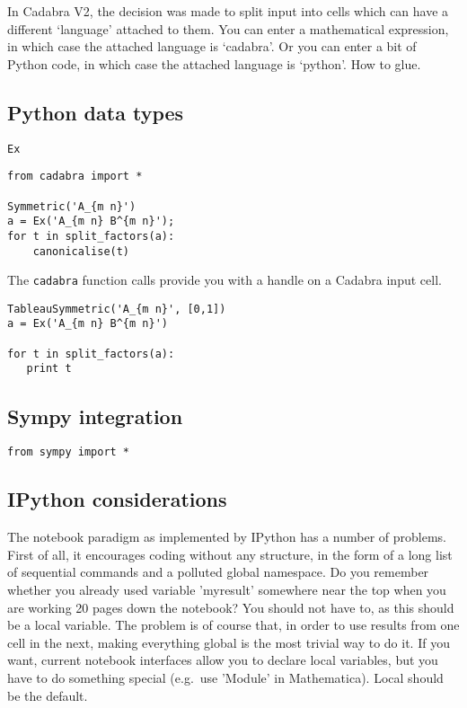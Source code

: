 \documentclass[11pt]{article}
\begin{document}
In Cadabra V2, the decision was made to split input into cells which
can have a different `language' attached to them. You can enter a
mathematical expression, in which case the attached language is
`cadabra'. Or you can enter a bit of Python code, in which case the
attached language is `python'. How to glue.

\subsection{Python data types}

\begin{description}
\item[{\tt Ex}] 
\end{description}


\begin{lstlisting}
from cadabra import *

Symmetric('A_{m n}')
a = Ex('A_{m n} B^{m n}');
for t in split_factors(a):
    canonicalise(t)
\end{lstlisting}

The {\tt cadabra} function calls provide you with a handle on a
Cadabra input cell.

\begin{lstlisting}
TableauSymmetric('A_{m n}', [0,1])
a = Ex('A_{m n} B^{m n}')

for t in split_factors(a):
   print t   
\end{lstlisting}


\subsection{Sympy integration}

\begin{lstlisting}
from sympy import *
\end{lstlisting}


\subsection{IPython considerations}

The notebook paradigm as implemented by IPython has a number of
problems. First of all, it encourages coding without any structure, in
the form of a long list of sequential commands and a polluted global
namespace. Do you remember whether you already used variable
'myresult' somewhere near the top when you are working 20 pages down
the notebook? You should not have to, as this should be a local
variable. The problem is of course that, in order to use results from
one cell in the next, making everything global is the most trivial way
to do it. If you want, current notebook interfaces allow you to
declare local variables, but you have to do something special
(e.g.~use 'Module' in Mathematica). Local should be the default.
\end{document}
